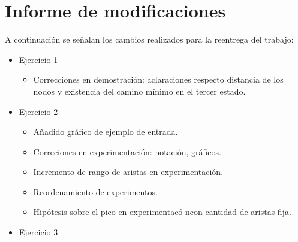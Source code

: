 \section*{Informe de modificaciones}

A continuación se señalan los cambios realizados para la reentrega del trabajo:

\begin{itemize}
	\item{
		Ejercicio 1
		\begin{itemize}
			\item{Correcciones en demostración: aclaraciones respecto distancia
				de los nodos y existencia del camino mínimo en el tercer estado.}
		\end{itemize}
	}
	\item{
		Ejercicio 2
		\begin{itemize}
			\item{Añadido gráfico de ejemplo de entrada.}
			\item{Correciones en experimentación: notación, gráficos.}
			\item{Incremento de rango de aristas en experimentación.}
			\item{Reordenamiento de experimentos.}
			\item{Hipótesis sobre el pico en experimentacó ncon cantidad de aristas fija.}
		\end{itemize}
	}
	\item{
		Ejercicio 3
	}
\end{itemize}
